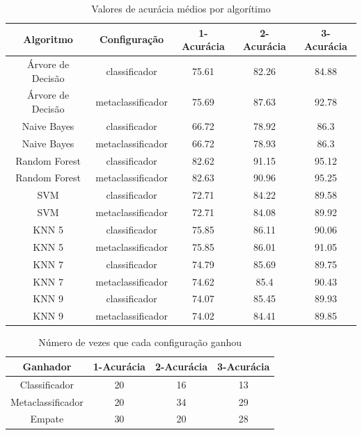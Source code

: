 \begin{table}[h!]
  \begin{center}
    \begin{tabular}{ccccc}
      \hline
      \textbf{Algoritmo} & \textbf{Configuração} & \textbf{1-Acurácia} & \textbf{2-Acurácia} & \textbf{3-Acurácia}\\
      \hline

      Árvore de Decisão & classificador & 75.61 & 82.26 & 84.88\\
      Árvore de Decisão & metaclassificador & 75.69 & 87.63 & 92.78\\
      Naive Bayes & classificador & 66.72 & 78.92 & 86.3\\
      Naive Bayes & metaclassificador & 66.72 & 78.93 & 86.3\\
      Random Forest & classificador & 82.62 & 91.15 & 95.12\\
      Random Forest & metaclassificador & 82.63 & 90.96 & 95.25\\
      SVM & classificador & 72.71 & 84.22 & 89.58\\
      SVM & metaclassificador & 72.71 & 84.08 & 89.92\\
      KNN 5 & classificador & 75.85 & 86.11 & 90.06\\
      KNN 5 & metaclassificador & 75.85 & 86.01 & 91.05\\
      KNN 7 & classificador & 74.79 & 85.69 & 89.75\\
      KNN 7 & metaclassificador & 74.62 & 85.4 & 90.43\\
      KNN 9 & classificador & 74.07 & 85.45 & 89.93\\
      KNN 9 & metaclassificador & 74.02 & 84.41 & 89.85\\


      \hline
    \end{tabular}
    \caption{Valores de acurácia médios por algorítimo}
    \label{tab:acuracias}
  \end{center}
\end{table}

\begin{table}[h!]
  \begin{center}
    \begin{tabular}{cccc}
      \hline
      \textbf{Ganhador} & \textbf{1-Acurácia} & \textbf{2-Acurácia} & \textbf{3-Acurácia}\\
      \hline

      Classificador & 20 & 16 & 13\\
      Metaclassificador & 20 & 34 & 29\\
      Empate & 30 & 20 & 28\\

      \hline
    \end{tabular}
    \caption{Número de vezes que cada configuração ganhou}
    \label{tab:acuracias2}
  \end{center}
\end{table}

